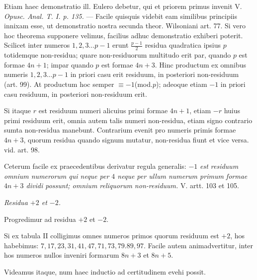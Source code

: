 Etiam haec demonstratio ill. Eulero debetur, qui et priorem primus invenit V. \emph{Opusc. Anal. T. I. p. 135.} --- Facile quisquis videbit eam similibus principiis innixam esse, ut demonstratio nostra secunda theor. Wilsoniani art. 77. Si vero hoc theorema supponere velimus, facilius adhuc demonstratio exhiberi poterit. Scilicet inter numeros $1,2,3\ldots p-1$ erunt $\frac{p-1}{2}$ residua quadratica ipsius $p$ totidemque non-residua; quare non-residuorum multitudo erit par, quando $p$ est formae $4n+1$; impar quando $p$ est formae $4n+3$. Hinc productum ex omnibus numeris $1,2,3\ldots p-1$ in priori casu erit residuum, in posteriori non-residuum (art. 99). At productum hoc semper $\equiv-1$(mod.$p$); adeoque etiam $-1$ in priori casu residuum, in posteriori non-residuum erit.

Si itaque $r$ est residuum numeri alicuius primi formae $4n+1$, etiam $-r$ huius primi residuum erit, omnia autem talis numeri non-residua, etiam signo contrario sumta non-residua manebunt. Contrarium evenit pro numeris primis formae $4n+3$, quorum residua quando signum mutatur, non-residua fiunt et vice versa. vid. art. 98.

Ceterum facile ex praecedentibus derivatur regula generalis: $-1$ \emph{est residuum omnium numerorum qui neque per $4$ neque per ullum numerum primum formae $4n+3$ dividi possunt; omnium reliquorum non-residuum.} V. artt. 103 et 105.

\begin{center}\emph{Residua $+2$ et $-2$.}\end{center}

Progredimur ad residua $+2$ et $-2$.

Si ex tabula II colligimus omnes numeros primos quorum residuum est $+2$, hos habebimus: $7,17,23,31,41,47,71,73,79.89,97$. Facile autem animadvertitur, inter hos numeros nullos inveniri formarum $8n+3$ et $8n+5$.

Videamus itaque, num haec inductio ad certitudinem evehi possit.

